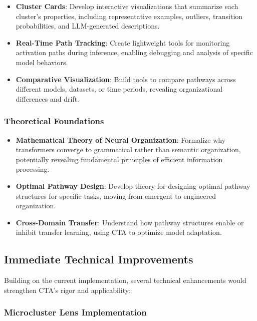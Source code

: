 \begin{itemize}
    \item \textbf{Cluster Cards}: Develop interactive visualizations that summarize each cluster's properties, including representative examples, outliers, transition probabilities, and LLM-generated descriptions.
    
    \item \textbf{Real-Time Path Tracking}: Create lightweight tools for monitoring activation paths during inference, enabling debugging and analysis of specific model behaviors.
    
    \item \textbf{Comparative Visualization}: Build tools to compare pathways across different models, datasets, or time periods, revealing organizational differences and drift.
\end{itemize}

\subsubsection{Theoretical Foundations}

\begin{itemize}
    \item \textbf{Mathematical Theory of Neural Organization}: Formalize why transformers converge to grammatical rather than semantic organization, potentially revealing fundamental principles of efficient information processing.
    
    \item \textbf{Optimal Pathway Design}: Develop theory for designing optimal pathway structures for specific tasks, moving from emergent to engineered organization.
    
    \item \textbf{Cross-Domain Transfer}: Understand how pathway structures enable or inhibit transfer learning, using CTA to optimize model adaptation.
\end{itemize}

\subsection{Immediate Technical Improvements}

Building on the current implementation, several technical enhancements would strengthen CTA's rigor and applicability:

\subsubsection{Microcluster Lens Implementation}


